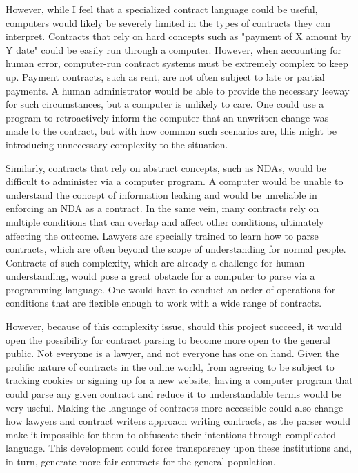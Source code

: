 \documentclass{article}
\theoremstyle{theorem}
\theoremstyle{definition}
\theoremstyle{remark}
\begin{document}
\medskip\noindent
However, while I feel that a specialized contract language could be useful, computers would likely be severely limited in the types of contracts they can interpret. Contracts that rely on hard concepts such as "payment of X amount by Y date" could be easily run through a computer. However, when accounting for human error, computer-run contract systems must be extremely complex to keep up. Payment contracts, such as rent, are not often subject to late or partial payments. A human administrator would be able to provide the necessary leeway for such circumstances, but a computer is unlikely to care. One could use a program to retroactively inform the computer that an unwritten change was made to the contract, but with how common such scenarios are, this might be introducing unnecessary complexity to the situation.

\medskip\noindent
Similarly, contracts that rely on abstract concepts, such as NDAs, would be difficult to administer via a computer program. A computer would be unable to understand the concept of information leaking and would be unreliable in enforcing an NDA as a contract. In the same vein, many contracts rely on multiple conditions that can overlap and affect other conditions, ultimately affecting the outcome. Lawyers are specially trained to learn how to parse contracts, which are often beyond the scope of understanding for normal people. Contracts of such complexity, which are already a challenge for human understanding, would pose a great obstacle for a computer to parse via a programming language. One would have to conduct an order of operations for conditions that are flexible enough to work with a wide range of contracts.

\medskip\noindent
However, because of this complexity issue, should this project succeed, it would open the possibility for contract parsing to become more open to the general public. Not everyone is a lawyer, and not everyone has one on hand. Given the prolific nature of contracts in the online world, from agreeing to be subject to tracking cookies or signing up for a new website, having a computer program that could parse any given contract and reduce it to understandable terms would be very useful. Making the language of contracts more accessible could also change how lawyers and contract writers approach writing contracts, as the parser would make it impossible for them to obfuscate their intentions through complicated language. This development could force transparency upon these institutions and, in turn, generate more fair contracts for the general population.
\end{document}
